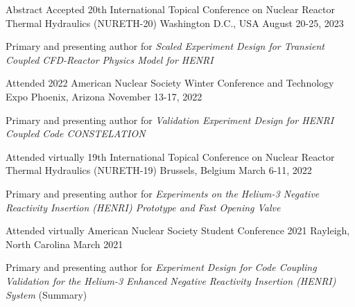 

\begin{cventries}

    \cventry
    {Abstract Accepted} %
    {20th International Topical Conference on Nuclear Reactor Thermal Hydraulics (NURETH-20)} %
    {Washington D.C., USA} %
    {August 20-25, 2023} %
    {
    \begin{cvitems}
        \item{Primary and presenting author for \textit{Scaled Experiment Design for Transient Coupled CFD-Reactor Physics Model for HENRI}}
    \end{cvitems}
    }


    \cventry
    {Attended} %
    {2022 American Nuclear Society Winter Conference and Technology Expo} %
    {Phoenix, Arizona} %
    {November 13-17, 2022} %
    {
    \begin{cvitems}
        \item{Primary and presenting author for \textit{Validation Experiment Design for HENRI Coupled Code CONSTELATION}}
    \end{cvitems}
    }

    \cventry
    {Attended virtually} %
    {19th International Topical Conference on Nuclear Reactor Thermal Hydraulics (NURETH-19)} %
    {Brussels, Belgium} %
    {March 6-11, 2022} %
    {
    \begin{cvitems}
        \item{Primary and presenting author for \textit{Experiments on the Helium-3 Negative Reactivity Insertion (HENRI) Prototype and Fast Opening Valve}}
    \end{cvitems}
    }

    \cventry
    {Attended virtually} %
    {American Nuclear Society Student Conference 2021} %
    {Rayleigh, North Carolina} %
    {March 2021} %
    {
    \begin{cvitems}
        \item{Primary and presenting author for \textit{Experiment Design for Code Coupling Validation for the Helium-3 Enhanced Negative Reactivity Insertion (HENRI) System} (Summary)}
    \end{cvitems}
    }


\end{cventries}
